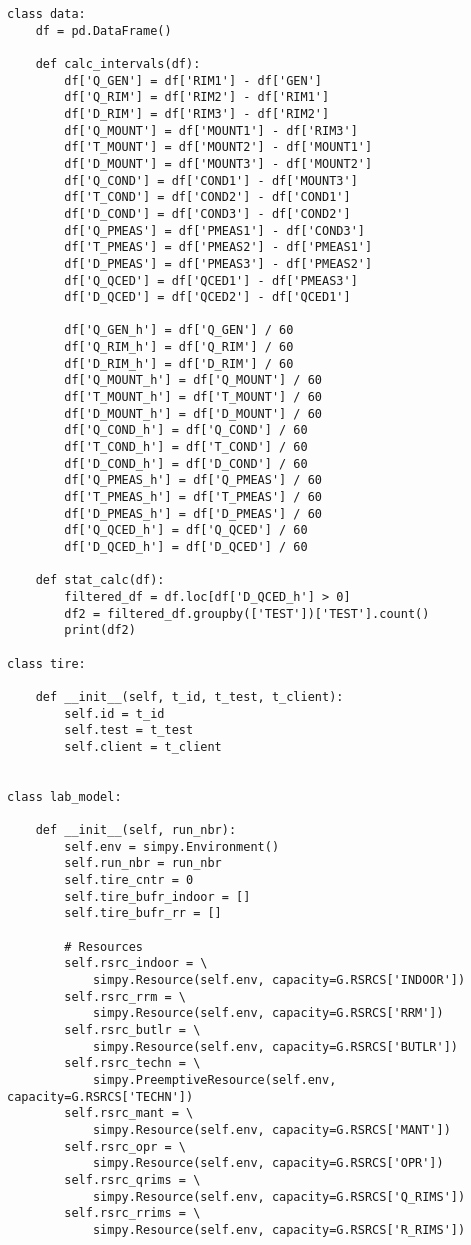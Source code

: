 \begin{verbatim}
class data:
    df = pd.DataFrame()

    def calc_intervals(df):
        df['Q_GEN'] = df['RIM1'] - df['GEN']
        df['Q_RIM'] = df['RIM2'] - df['RIM1']
        df['D_RIM'] = df['RIM3'] - df['RIM2']
        df['Q_MOUNT'] = df['MOUNT1'] - df['RIM3']
        df['T_MOUNT'] = df['MOUNT2'] - df['MOUNT1']
        df['D_MOUNT'] = df['MOUNT3'] - df['MOUNT2']
        df['Q_COND'] = df['COND1'] - df['MOUNT3']
        df['T_COND'] = df['COND2'] - df['COND1']
        df['D_COND'] = df['COND3'] - df['COND2']
        df['Q_PMEAS'] = df['PMEAS1'] - df['COND3']
        df['T_PMEAS'] = df['PMEAS2'] - df['PMEAS1']
        df['D_PMEAS'] = df['PMEAS3'] - df['PMEAS2']
        df['Q_QCED'] = df['QCED1'] - df['PMEAS3']
        df['D_QCED'] = df['QCED2'] - df['QCED1']

        df['Q_GEN_h'] = df['Q_GEN'] / 60
        df['Q_RIM_h'] = df['Q_RIM'] / 60
        df['D_RIM_h'] = df['D_RIM'] / 60
        df['Q_MOUNT_h'] = df['Q_MOUNT'] / 60
        df['T_MOUNT_h'] = df['T_MOUNT'] / 60
        df['D_MOUNT_h'] = df['D_MOUNT'] / 60
        df['Q_COND_h'] = df['Q_COND'] / 60
        df['T_COND_h'] = df['T_COND'] / 60
        df['D_COND_h'] = df['D_COND'] / 60
        df['Q_PMEAS_h'] = df['Q_PMEAS'] / 60
        df['T_PMEAS_h'] = df['T_PMEAS'] / 60
        df['D_PMEAS_h'] = df['D_PMEAS'] / 60
        df['Q_QCED_h'] = df['Q_QCED'] / 60
        df['D_QCED_h'] = df['D_QCED'] / 60

    def stat_calc(df):
        filtered_df = df.loc[df['D_QCED_h'] > 0]
        df2 = filtered_df.groupby(['TEST'])['TEST'].count()
        print(df2)

class tire:

    def __init__(self, t_id, t_test, t_client):
        self.id = t_id
        self.test = t_test
        self.client = t_client


class lab_model:

    def __init__(self, run_nbr):
        self.env = simpy.Environment()
        self.run_nbr = run_nbr
        self.tire_cntr = 0
        self.tire_bufr_indoor = []
        self.tire_bufr_rr = []

        # Resources
        self.rsrc_indoor = \
            simpy.Resource(self.env, capacity=G.RSRCS['INDOOR'])
        self.rsrc_rrm = \
            simpy.Resource(self.env, capacity=G.RSRCS['RRM'])
        self.rsrc_butlr = \
            simpy.Resource(self.env, capacity=G.RSRCS['BUTLR'])
        self.rsrc_techn = \
            simpy.PreemptiveResource(self.env, capacity=G.RSRCS['TECHN'])
        self.rsrc_mant = \
            simpy.Resource(self.env, capacity=G.RSRCS['MANT'])
        self.rsrc_opr = \
            simpy.Resource(self.env, capacity=G.RSRCS['OPR'])
        self.rsrc_qrims = \
            simpy.Resource(self.env, capacity=G.RSRCS['Q_RIMS'])
        self.rsrc_rrims = \
            simpy.Resource(self.env, capacity=G.RSRCS['R_RIMS'])


\end{verbatim}
